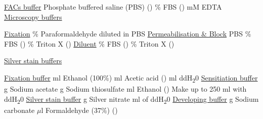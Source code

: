 \documentclass[a4paper]{report}
\begin{document}
\begin{indentlist}
\vspace{2mm}\newline\underline{FACs buffer}
\vspace{2mm}\newline Phosphate buffered saline (PBS) ()
\% FBS () 
 mM EDTA 
\vspace{2mm}\newline\underline{Microscopy buffers}
\vspace{2mm}\begin{adjustwidth}{10mm}
\newline\underline{Fixation} 
\% Paraformaldehyde diluted in PBS
\vspace{2mm}\newline\underline{Permeabilisation \& Block}
\newline PBS
\% FBS () 
\% Triton X ()
\vspace{2mm}\newline\underline{Diluent}
\% FBS ()
\% Triton X ()
\end{adjustwidth}
\vspace{2mm}\newline\underline{Silver stain buffers}
\begin{adjustwidth}{10mm}
\newline\underline{Fixation buffer}
 ml Ethanol (100\%)
 ml Acetic acid ()
 ml ddH\textsubscript{2}0
\vspace{2mm}\newline\underline{Sensitiation buffer}
 g Sodium acetate
 g Sodium thiosulfate 
 ml Ethanol () 
\newline Make up to 250 ml with ddH\textsubscript{2}0
\vspace{2mm}\newline\underline{Silver stain buffer}
 g Silver nitrate
 ml of ddH\textsubscript{2}0
\vspace{2mm}\newline\underline{Developing buffer}
 g Sodium carbonate 
 $\mu$l Formaldehyde (37\%) ()
\end{adjustwidth}


\end{indentlist}
\end{document}
